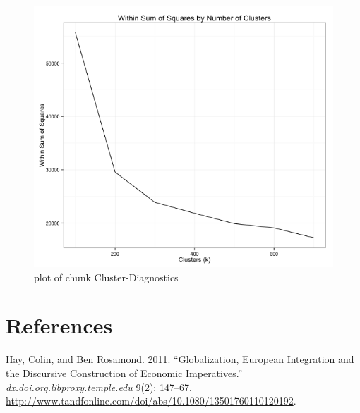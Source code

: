 \documentclass[11pt,article,oneside]{memoir}
\makeatletter
\def\maxwidth{\ifdim\Gin@nat@width>\linewidth\linewidth
\else\Gin@nat@width\fi}
\let\Oldincludegraphics\includegraphics
\renewcommand{\includegraphics}[1]{\Oldincludegraphics[width=\maxwidth]{#1}}
\makeatother
\begin{document}
\begin{figure}[htbp]
\centering
\includegraphics{figure/Cluster-Diagnostics.png}
\caption{plot of chunk Cluster-Diagnostics}
\end{figure}

\pagebreak

\section{References}\label{references}

\setlength{\parindent}{-0.2in} \setlength{\leftskip}{0.2in}
\setlength{\parskip}{8pt} \vspace*{-0.2in} \noindent

Hay, Colin, and Ben Rosamond. 2011. ``Globalization, European
Integration and the Discursive Construction of Economic Imperatives.''
\emph{dx.doi.org.libproxy.temple.edu} 9(2): 147--67.
\url{http://www.tandfonline.com/doi/abs/10.1080/13501760110120192}.
\end{document}
